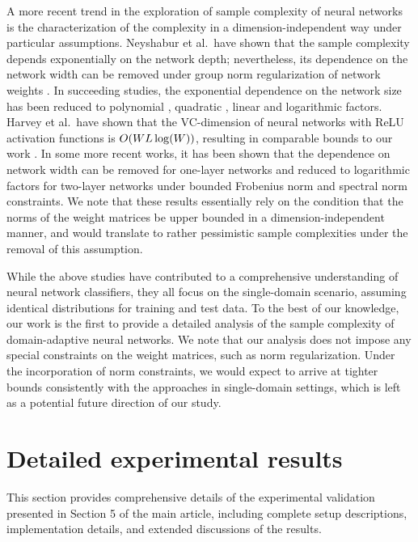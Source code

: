\documentclass[review,supplement,onefignum,onetabnum]{siamonline250211}
\begin{document}
A more recent trend in the exploration of sample complexity of neural networks is the  characterization of the complexity in a dimension-independent way under particular assumptions. Neyshabur et al.~have shown that the sample complexity depends exponentially on the network depth; nevertheless, its dependence on the network width can be removed under group norm regularization of network weights \cite{NeyshaburTS15}. In succeeding studies, the exponential dependence on the network size has been reduced to polynomial \cite{WeiM19}, quadratic \cite{NeyshaburBS18}, linear \cite{GolowichRS18} and logarithmic \cite{BartlettFT17} factors. Harvey et al.~have shown that the VC-dimension of neural networks with ReLU activation functions is $O(W L \log(W))$, resulting in comparable bounds to our work \cite{HarveyLM17}.  In some more recent works, it has been shown that the dependence on network width can be removed for one-layer networks \cite{VardiSS22} and reduced to logarithmic factors for two-layer networks \cite{DanielyG24} under bounded Frobenius norm and spectral norm constraints. We note that these results essentially rely on the condition that the norms of the weight matrices be upper bounded in a dimension-independent manner, and would translate to rather pessimistic sample complexities under the removal of this assumption. 


\begin{remark} 
While the above studies have contributed to a comprehensive understanding of neural network classifiers, they all focus on the single-domain scenario, assuming identical distributions for training and test data.  To the best of our knowledge, our work is the first to provide a detailed analysis of the sample complexity of domain-adaptive neural networks. We note that our analysis does not impose any special constraints on the weight matrices, such as norm regularization. Under the incorporation of norm constraints, we would expect to arrive at tighter bounds consistently with the approaches in single-domain settings, which is left as a potential future direction of our study.
\end{remark}


\clearpage 
\section{Detailed experimental results}
\label{sec_detailed_exp_results}

This section provides comprehensive details of the experimental validation presented in Section 5 of the main article, including complete setup descriptions, implementation details, and extended discussions of the results.
\end{document}
